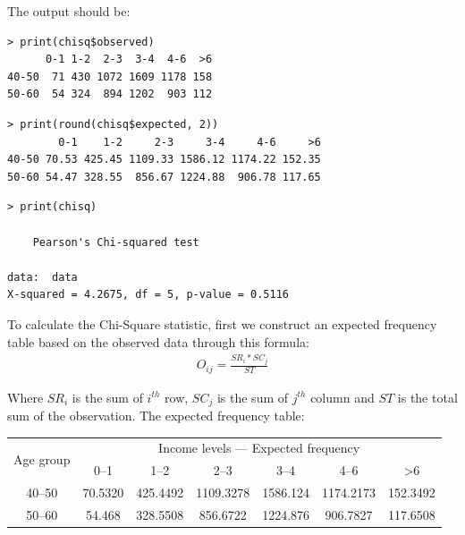 \documentclass[a4paper]{article}
\numberwithin{equation}{section}
\begin{document}
The output should be:
\begin{mdframed}[leftline=false,rightline=false,backgroundcolor=gray!10,nobreak=true]
  \begin{verbatim}
> print(chisq$observed)
      0-1 1-2  2-3  3-4  4-6  >6
40-50  71 430 1072 1609 1178 158
50-60  54 324  894 1202  903 112
  \end{verbatim}
  \begin{verbatim}
> print(round(chisq$expected, 2))
        0-1    1-2     2-3     3-4     4-6     >6
40-50 70.53 425.45 1109.33 1586.12 1174.22 152.35
50-60 54.47 328.55  856.67 1224.88  906.78 117.65
  \end{verbatim}
  \begin{verbatim}
> print(chisq)

	Pearson's Chi-squared test

data:  data
X-squared = 4.2675, df = 5, p-value = 0.5116
  \end{verbatim}
\end{mdframed}

To calculate the Chi-Square statistic, first we construct an expected frequency table based on the observed data through this formula:
\begin{align*}
  O_{ij} = \frac{SR_i * SC_j}{ST}
\end{align*}

Where \(SR_i\) is the sum of \(i^{th}\) row, \(SC_j\) is the sum of \(j^{th}\) column and \(ST\) is the total sum of the observation. The expected frequency table:
\begin{center}
  \begin{tabular}{ccccccc}
    \toprule
    \multirow{2}{*}{Age group} & \multicolumn{6}{c}{Income levels --- Expected frequency}                                                          \\
    \cmidrule(lr){2-7}
                               & 0--1                                                     & 1--2     & 2--3      & 3--4     & 4--6      & >6       \\
    \midrule
    40--50                     & 70.5320                                                  & 425.4492 & 1109.3278 & 1586.124 & 1174.2173 & 152.3492 \\
    50--60                     & 54.468                                                   & 328.5508 & 856.6722  & 1224.876 & 906.7827  & 117.6508 \\
    \bottomrule
  \end{tabular}
\end{center}
\end{document}
